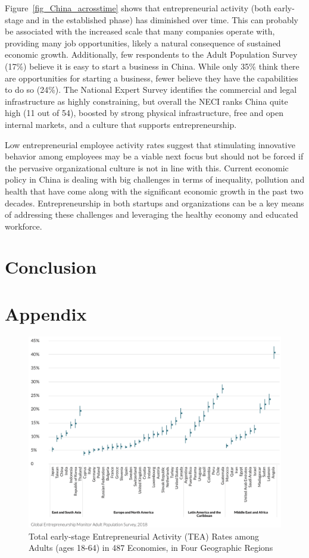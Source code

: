\documentclass[10pt]{article}
\begin{document}
Figure~\ref{fig_China_acrosstime} shows that entrepreneurial activity (both early-stage and in the established phase) has diminished over time. This can probably be associated with the increased scale that many companies operate with, providing many job opportunities, likely a natural consequence of sustained economic growth. Additionally, few respondents to the Adult Population Survey (17\%) believe it is easy to start a business
in China. While only 35\% think there are opportunities for starting a business, fewer believe they have the capabilities to do so
(24\%). The National Expert Survey identifies the commercial and legal infrastructure as highly constraining, but overall the NECI ranks China quite high (11 out of 54), boosted by strong physical infrastructure, free and open internal markets, and a culture that supports entrepreneurship.

Low entrepreneurial employee activity rates suggest that stimulating innovative behavior among employees may be a viable next focus but should not be forced if the pervasive organizational culture is not in line with this. Current economic policy in China is dealing with big challenges in terms of inequality, pollution and health that have come along with the significant economic growth in the past two decades. Entrepreneurship in both startups and organizations can be a key means of addressing these challenges and leveraging the healthy economy and educated workforce.



\section{Conclusion}

\section{Appendix}

\begin{figure}[h]
\centerline{\includegraphics[width = 1\textwidth]{screenshot//2_2.png}}
\caption{Total early-stage Entrepreneurial Activity (TEA) Rates among Adults (ages 18-64) in 487 Economies, in Four Geographic Regions}
\label{fig_TEA_global}
\end{figure}
\end{document}
